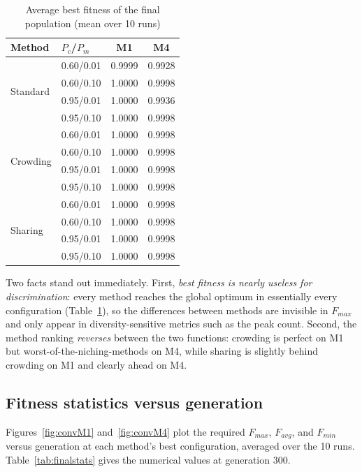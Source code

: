 \documentclass[conference]{IEEEtran}
\begin{document}
\begin{table}[htbp]
\caption{Average best fitness of the final population (mean over 10 runs)}
\label{tab:bestfit}
\centering
\footnotesize
\begin{tabular}{@{}llcc@{}}
\toprule
Method & $P_c$/$P_m$ & M1 & M4 \\
\midrule
\multirow{4}{*}{Standard} & 0.60/0.01 & 0.9999 & 0.9928 \\
 & 0.60/0.10 & 1.0000 & 0.9998 \\
 & 0.95/0.01 & 1.0000 & 0.9936 \\
 & 0.95/0.10 & 1.0000 & 0.9998 \\
\midrule
\multirow{4}{*}{Crowding} & 0.60/0.01 & 1.0000 & 0.9998 \\
 & 0.60/0.10 & 1.0000 & 0.9998 \\
 & 0.95/0.01 & 1.0000 & 0.9998 \\
 & 0.95/0.10 & 1.0000 & 0.9998 \\
\midrule
\multirow{4}{*}{Sharing} & 0.60/0.01 & 1.0000 & 0.9998 \\
 & 0.60/0.10 & 1.0000 & 0.9998 \\
 & 0.95/0.01 & 1.0000 & 0.9998 \\
 & 0.95/0.10 & 1.0000 & 0.9998 \\
\bottomrule
\end{tabular}
\end{table}

Two facts stand out immediately. First, \emph{best fitness is nearly useless
for discrimination}: every method reaches the global optimum in essentially
every configuration (Table~\ref{tab:bestfit}), so the differences between
methods are invisible in $F_{max}$ and only appear in diversity-sensitive
metrics such as the peak count. Second, the method ranking
\emph{reverses} between the two functions: crowding is perfect on M1 but
worst-of-the-niching-methods on M4, while sharing is slightly behind crowding
on M1 and clearly ahead on M4.

\subsection{Fitness statistics versus generation}

Figures~\ref{fig:convM1} and~\ref{fig:convM4} plot the required
$F_{max}$, $F_{avg}$, and $F_{min}$ versus generation at each method's best
configuration, averaged over the 10 runs. Table~\ref{tab:finalstats} gives the
numerical values at generation 300.
\end{document}
